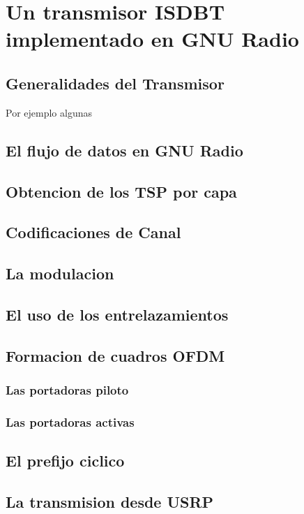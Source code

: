 \chapter{Un transmisor ISDBT implementado en GNU Radio}

\section{Generalidades del Transmisor}
Por ejemplo algunas
\section{El flujo de datos en GNU Radio}

\section{Obtencion de los TSP por capa}
\section{Codificaciones de Canal}
\section{La modulacion}
\section{El uso de los entrelazamientos}
\section{Formacion de cuadros OFDM}
	\subsection{Las portadoras piloto}
	\subsection{Las portadoras activas}
\section{El prefijo ciclico}
\section{La transmision desde USRP}